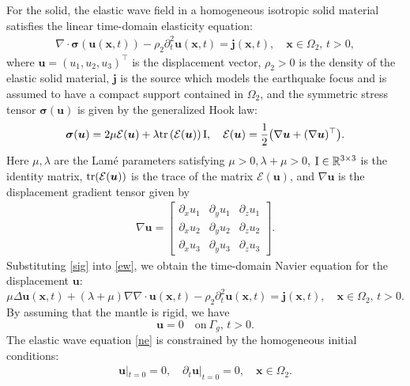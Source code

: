 \documentclass[final,leqno]{siamltex}
\begin{document}
For the solid, the elastic wave field  in a homogeneous isotropic solid material
satisfies the linear time-domain  elasticity equation:
\begin{align}\label{ew}
 \nabla \cdot \boldsymbol  \sigma (\boldsymbol u (\boldsymbol x, t))
 -\rho_2 \partial_t^2 \boldsymbol u (\boldsymbol x, t)= \boldsymbol j
(\boldsymbol x, t), \quad \boldsymbol x \in \Omega_2,\,t>0,
\end{align}
where $\boldsymbol u =(u_1, u_2, u_3)^\top$ is the displacement vector,
$\rho_2>0$ is the density of the elastic solid material, $\boldsymbol j$ is the
source which models the earthquake focus and is assumed to have a compact
support contained in $\Omega_2$, and the symmetric stress tensor $\boldsymbol
\sigma (\boldsymbol u)$ is given by the
generalized Hook law:
\begin{equation}\label{sig}
 \boldsymbol \sigma (\boldsymbol u) = 2 \mu {\mathcal E} (\boldsymbol u)+\lambda
 {\rm tr} \left({\mathcal E} (\boldsymbol u) \right) {\rm  I},
 \quad {\mathcal E} (\boldsymbol u) =\frac{1}{2} \big(\nabla \boldsymbol u
+(\nabla \boldsymbol u)^{\top} \big).
\end{equation}
Here $\mu, \lambda$ are the Lam\'{e} parameters satisfying $\mu>0, \lambda +\mu
>0$, $\rm I \in \mathbb R^{3\times 3}$ is the identity matrix,
${\rm tr}(\mathcal{E}(\boldsymbol u))$ is the trace of the matrix
$\mathcal{E}(\boldsymbol u)$, and $\nabla \boldsymbol u$ is the displacement
gradient tensor given by
\begin{align*}
 \nabla \boldsymbol u=
 \left[
 \begin{matrix}
  \partial_x u_1 & \partial_y u_1 & \partial_z u_1 \\
  \partial_x u_2 & \partial_y u_2 & \partial_z u_2 \\
  \partial_x u_3& \partial_y u_3 & \partial_z u_3
 \end{matrix}
\right].
\end{align*}
Substituting \eqref{sig} into \eqref{ew}, we obtain the time-domain Navier
equation for the displacement $\boldsymbol u$:
 \begin{equation}\label{ne}
  \mu \Delta \boldsymbol u (\boldsymbol x, t)+ (\lambda + \mu ) \nabla \nabla
\cdot \boldsymbol u (\boldsymbol x, t) -\rho_2 \partial_t^2 \boldsymbol u
(\boldsymbol x, t) = \boldsymbol  j (\boldsymbol x,t),
  \quad \boldsymbol x \in \Omega_2,\, t>0.
 \end{equation}
By assuming that the mantle is rigid, we have
\[
 \boldsymbol u=0 \quad \text{on}~\Gamma_g,\, t>0.
\]
The elastic wave equation \eqref{ne} is constrained by the homogeneous initial
conditions:
\begin{align*}
 \boldsymbol u|_{t=0}=0, \quad \partial_t  \boldsymbol u|_{t=0}=0,
\quad  \boldsymbol x \in \Omega_2.
\end{align*}
\end{document}
